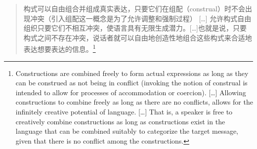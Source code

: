 \begin{quote}
构式可以自由组合并组成真实表达，只要它们在组配（construal）时不会出现冲突（引入组配这一概念是为了允许调整和强制过程）
[\ldots]
允许构式自由组织只要它们不相互冲突，使语言具有无限生成潜力。[\ldots]也就是说，只要构式之间不存在冲突，说话者就可以自由地创造性地组合这些构式来合适地表达想要表达的信息。\citep[]{Goldberg2006a}\footnote{%
Constructions are combined freely to form actual expressions as long
as they can be construed as not being in conflict (invoking the notion
of construal is intended to allow for processes of accommodation or
coercion). 
[\ldots] 
Allowing constructions to combine freely as long as there are no
conflicts, allows for the infinitely creative potential of language.
[\ldots] That is, a speaker is free to creatively combine constructions as
long as constructions exist in the language that can be combined
suitably to categorize the target message, given that there is no
conflict among the constructions.
} 
\end{quote}

